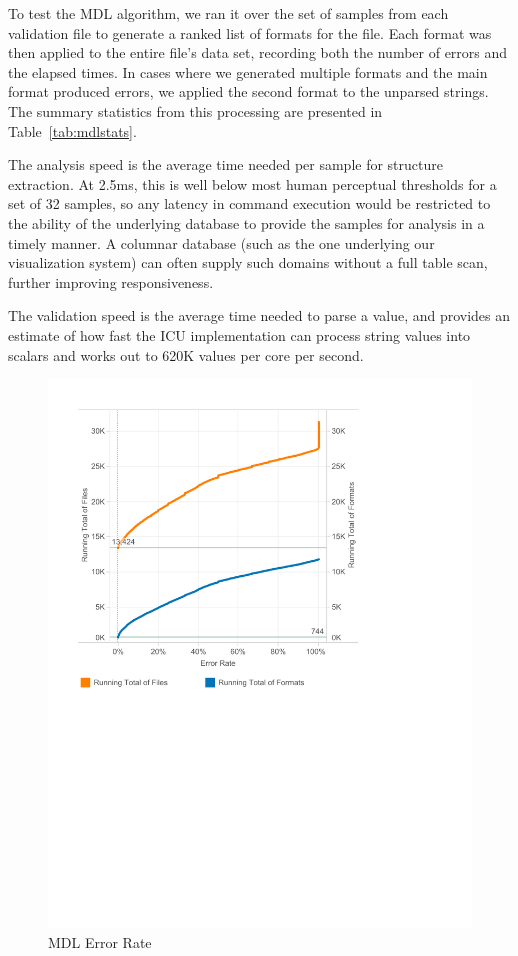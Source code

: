 To test the MDL algorithm, we ran it over the set of samples from each validation file to generate a ranked list of formats for the file. Each format was then applied to the entire file's data set, recording both the number of errors and the elapsed times. In cases where we generated multiple formats and the main format produced errors, we applied the second format to the unparsed strings. The summary statistics from this processing are presented in Table~\ref{tab:mdlstats}.

The analysis speed is the average time needed per sample for structure extraction. At 2.5ms, this is well below most human perceptual thresholds for a set of 32 samples, so any latency in command execution would be restricted to the ability of the underlying database to provide the samples for analysis in a timely manner. A columnar database (such as the one underlying our visualization system) can often supply such domains without a full table scan, further improving responsiveness.

The validation speed is the average time needed to parse a value, and provides an estimate of how fast the ICU implementation can process string values into scalars and works out to 620K values per core per second.
 
\begin{figure}[ht]
\centering
\includegraphics[width=\columnwidth]{figures/FigureM2}
\caption{MDL Error Rate}
\label{fig:M2}
\end{figure}

